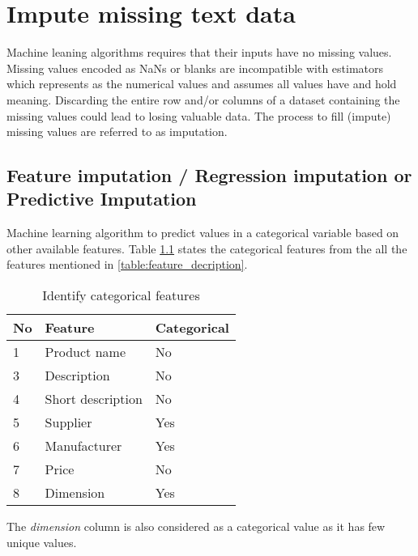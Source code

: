 \chapter{Impute missing text data} \label{ch:data-imputation}

Machine leaning algorithms requires that their inputs have no missing values.
Missing values encoded as NaNs or blanks are incompatible with estimators which represents as the numerical values and assumes all values have and hold meaning. Discarding the entire row and/or columns of a dataset containing the missing values could lead to losing valuable data. The process to fill (impute) missing values are referred to as imputation.

\section{Feature imputation / Regression imputation or \\ Predictive Imputation}

Machine learning algorithm to predict values in a categorical variable based on other available features. Table \ref{table:feature_imputation} states the categorical features from the all the features mentioned in \ref{table:feature_decription}.


\begin{table}[h]
    \centering
    \caption{Identify categorical features}
    \label{table:feature_imputation}
    \begin{tabular}{ lll }
          \toprule
          
          \textbf{No}& \textbf{Feature} & \textbf{Categorical}\\
          \midrule
          1&Product name & No\\
          3&Description & No\\         
          4&Short description  & No\\
          5&Supplier  & Yes\\
          6&Manufacturer  &  Yes\\           
          7&Price  &  No \\
          8&Dimension  & Yes\\
          \bottomrule
          \end{tabular}
\end{table}

The \textit{dimension} column is also considered as a categorical value as it has few unique values.

